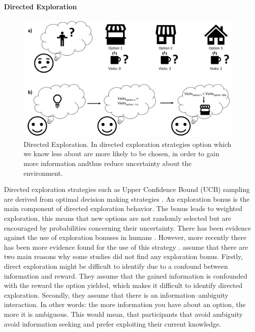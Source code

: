 \paragraph{Directed Exploration}
\begin{figure}
    \centering
    \includegraphics[width=1\textwidth]{Plots/DirectedExploration.pdf}
    \caption[Directed Exploration.]{Directed Exploration. In directed exploration strategies option which we know less about are more likely to be chosen, in order to gain more information andthus reduce uncertainty about the environment.}
    \label{fig:DirectedExploration}
\end{figure}
Directed exploration strategies such as Upper Confidence Bound (UCB) sampling \citep{auer2002finite} are derived from optimal decision making strategies \citep{wilson2014humans}.  %
An exploration bonus is the main component of directed exploration behavior. The bonus leads to weighted exploration, this means that new options are not randomly selected but are encouraged by probabilities concerning their uncertainty. There has been evidence against the use of exploration bonuses in humans \citep{daw2006cortical}. However, more recently there has been more evidence found for the use of this strategy \citep{wu2017mapping, wu2018connecting, wu2018exploration, schulz2018searching, wilson2014humans, gershman2018deconstructing,knox2012nature, steyvers2009bayesian, }.    
\cite{wilson2014humans} assume that there are two main reasons why some studies did not find any exploration bonus. Firstly, direct exploration might be difficult to identify due to a confound between information and reward. They assume that the gained information is confounded with the reward the option yielded, which makes it difficult to identify directed exploration. 
Secondly, they assume that there is an information--ambiguity interaction. In other words: the more information you have about an option, the more it is ambiguous. This would mean, that participants that avoid ambiguity avoid information seeking and prefer exploiting their current knowledge.


